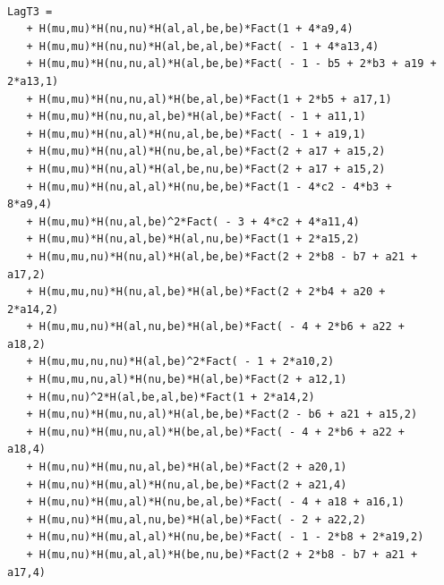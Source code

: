 \documentclass[aspectratio=169,usenames,dvipsnames]{beamer}
\begin{document}
\begin{frame}[t,fragile]{\centering {}\\
    {\centering{}}  } \scriptsize
{}
\vspace{1mm}
\newsavebox\myv
\begin{columns}
  \begin{column}{0.23\textwidth}
  \end{column}
  \begin{column}{\textwidth}
\begin{lrbox}{\myv}\begin{minipage}{\textwidth}
\begin{Verbatim}[gobble=2,frame=single,framesep=2mm,label=The Total Lagrangian
For Triple Graviton Vertex,labelposition=all]
  LagT3 =
   + H(mu,mu)*H(nu,nu)*H(al,al,be,be)*Fact(1 + 4*a9,4)
   + H(mu,mu)*H(nu,nu)*H(al,be,al,be)*Fact( - 1 + 4*a13,4)
   + H(mu,mu)*H(nu,nu,al)*H(al,be,be)*Fact( - 1 - b5 + 2*b3 + a19 + 2*a13,1)
   + H(mu,mu)*H(nu,nu,al)*H(be,al,be)*Fact(1 + 2*b5 + a17,1)
   + H(mu,mu)*H(nu,nu,al,be)*H(al,be)*Fact( - 1 + a11,1)
   + H(mu,mu)*H(nu,al)*H(nu,al,be,be)*Fact( - 1 + a19,1)
   + H(mu,mu)*H(nu,al)*H(nu,be,al,be)*Fact(2 + a17 + a15,2)
   + H(mu,mu)*H(nu,al)*H(al,be,nu,be)*Fact(2 + a17 + a15,2)
   + H(mu,mu)*H(nu,al,al)*H(nu,be,be)*Fact(1 - 4*c2 - 4*b3 + 8*a9,4)
   + H(mu,mu)*H(nu,al,be)^2*Fact( - 3 + 4*c2 + 4*a11,4)
   + H(mu,mu)*H(nu,al,be)*H(al,nu,be)*Fact(1 + 2*a15,2)
   + H(mu,mu,nu)*H(nu,al)*H(al,be,be)*Fact(2 + 2*b8 - b7 + a21 + a17,2)
   + H(mu,mu,nu)*H(nu,al,be)*H(al,be)*Fact(2 + 2*b4 + a20 + 2*a14,2)
   + H(mu,mu,nu)*H(al,nu,be)*H(al,be)*Fact( - 4 + 2*b6 + a22 + a18,2)
   + H(mu,mu,nu,nu)*H(al,be)^2*Fact( - 1 + 2*a10,2)
   + H(mu,mu,nu,al)*H(nu,be)*H(al,be)*Fact(2 + a12,1)
   + H(mu,nu)^2*H(al,be,al,be)*Fact(1 + 2*a14,2)
   + H(mu,nu)*H(mu,nu,al)*H(al,be,be)*Fact(2 - b6 + a21 + a15,2)
   + H(mu,nu)*H(mu,nu,al)*H(be,al,be)*Fact( - 4 + 2*b6 + a22 + a18,4)
   + H(mu,nu)*H(mu,nu,al,be)*H(al,be)*Fact(2 + a20,1)
   + H(mu,nu)*H(mu,al)*H(nu,al,be,be)*Fact(2 + a21,4)
   + H(mu,nu)*H(mu,al)*H(nu,be,al,be)*Fact( - 4 + a18 + a16,1)
   + H(mu,nu)*H(mu,al,nu,be)*H(al,be)*Fact( - 2 + a22,2)
   + H(mu,nu)*H(mu,al,al)*H(nu,be,be)*Fact( - 1 - 2*b8 + 2*a19,2)
   + H(mu,nu)*H(mu,al,al)*H(be,nu,be)*Fact(2 + 2*b8 - b7 + a21 + a17,4)

\end{Verbatim}
\end{minipage}
\end{lrbox}
\end{column}
\end{columns}
\end{frame}
\end{document}
